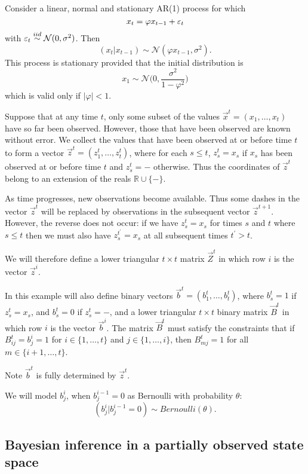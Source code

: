 Consider a linear, normal and stationary AR(1) process for which
\begin{equation*}
    x_{t} = \varphi x_{t-1} + \varepsilon_{t}
\end{equation*}
with $\varepsilon_{t} \stackrel{iid}{\sim} \mathcal{N}(0, \sigma^{2})$.
Then
\[
    (x_{t} | x_{t-1}) \sim \mathcal{N} (\varphi x_{t-1}, \sigma^{2}).
\]
This process is stationary provided that the initial distribution is
\[
x_{1} \sim \mathcal{N} \Bigg (0, \frac{\sigma^2}{1- \varphi^2} \Bigg )
\]
which is valid only if $|\varphi| < 1$.

Suppose that at any time $t$, only some subset of the values $\vec {x}^{t} = (x_1, \dots, x_{t})$ have so far been observed. However, those that have been observed are known without error. We collect the values that have been observed at or before time $t$ to form a vector $\vec{z}^{t} = (z_1^{t}, \dots, z_{t}^{t})$, where for each $s \leq t$, $z_s^{t} = x_s$ if $x_s$ has been observed at or before time $t$ and $z_s^{t} = -$ otherwise. Thus the coordinates of $\vec{z}^{t}$ belong to an extension of the reals $\mathbb{R} \cup \{ - \}$.

As time progresses, new observations become available. Thus some dashes in the vector $\vec{z}^{t}$ will be replaced by observations in the subsequent vector $\vec{z}^{t+1}$. However, the reverse does not occur: if we have $z_s^{t} = x_s$ for times $s$ and $t$ where $s \leq t$ then we must also have $z_s^{t^{\prime}} = x_s$ at all subsequent times $t^{\prime} > t$.

We will therefore define a lower triangular $t \times t$ matrix $\vec{Z}^{t}$ in which row $i$ is the vector $\vec{z}^{i}$.

In this example will also define binary vectors $\vec{b}^{t} = (b_1^{t}, \dots, b_{t}^{t})$, where $b_s^{t} = 1$ if $z_s^{t} = x_s$, and $b_s^{t} = 0$ if $z_s^{t} = -$, and a lower triangular $t \times t$ binary matrix $\vec{B}^{t}$ in which row $i$ is the vector $\vec{b}^{i}$.
The matrix $\vec{B}^{t}$ must satisfy the constraints that if $B_{ij}^{t} = b_j^{i} = 1$ for $i \in \{ 1, \ldots, t \}$ and $j \in \{ 1, \ldots, i \}$, then $B_{mj}^{t} = 1$ for all $m \in \{ i+1, \ldots, t \}$.

Note $\vec{b}^{t}$ is fully determined by $\vec{z}^{t}$.

We will model $b_j^{i}$, when $b_j^{i-1} = 0$ as Bernoulli with probability $\theta$:
\[
(b_j^{i} | b_j^{i-1} = 0) \sim Bernoulli(\theta).
\]

\subsection{Bayesian inference in a partially observed state space}

